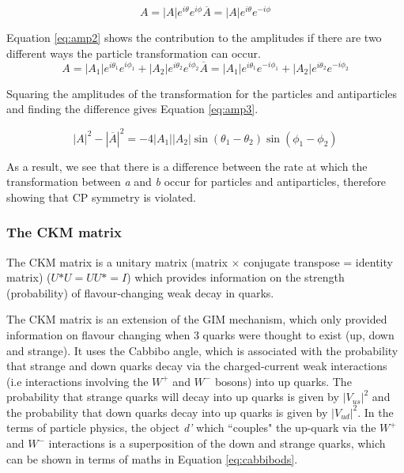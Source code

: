 \documentclass[11pt,oneside,a4paper]{article}
\begin{document}
	
\begin{equation}
\label{eq:amp}
A=|A|e^{i\theta }e^{i\phi }
{\overline{A}}=|A|e^{i\theta }e^{-i\phi }
\end{equation}

Equation \ref{eq:amp2} shows the contribution to the amplitudes if there are two different ways the particle transformation can occur.
\begin{equation}
\label{eq:amp2}
A=|A_{1}|e^{i\theta _{1}}e^{i\phi _{1}}+|A_{2}|e^{i\theta _{2}}e^{i\phi _{2}}
{\overline {A}}=|A_{1}|e^{i\theta _{1}}e^{-i\phi _{1}}+|A_{2}|e^{i\theta _{2}}e^{-i\phi _{2}}
\end{equation}

Squaring the amplitudes of the transformation for the particles and antiparticles and finding the difference gives Equation \ref{eq:amp3}.

\begin{equation}
\label{eq:amp3}
{\displaystyle |A|^{2}-|{\overline {A}}|^{2}=-4|A_{1}||A_{2}|\sin(\theta _{1}-\theta _{2})\sin(\phi _{1}-\phi _{2})}
\end{equation}

As a result, we see that there is a difference between the rate at which the transformation between \textit{a} and \textit{b} occur for particles and antiparticles, therefore showing that CP symmetry is violated.


\subsubsection{The CKM matrix}

The CKM matrix is a unitary matrix (matrix $\times$ conjugate transpose = identity matrix) ($U\mbox{*}U = UU\mbox{*}=I$) which provides information on the strength (probability) of flavour-changing weak decay in quarks.

The CKM matrix is an extension of the GIM mechanism, which only provided information on flavour changing when 3 quarks were thought to exist (up, down and strange). It uses the Cabbibo angle, which is associated with the probability that strange and down quarks decay via the charged-current weak interactions (i.e interactions involving the $W^+$ and $W^-$ bosons) into up quarks. The probability that strange quarks will decay into up quarks is given by $|V_{us}|^2$ and the probability that down quarks decay into up quarks is given by $|V_{ud}|^2$. In the terms of particle physics, the object \textit{d'} which ``couples" the up-quark via the $W^+$ and $W^-$ interactions is a superposition of the down and strange quarks, which can be shown in terms of maths in Equation \ref{eq:cabbibods}.
\end{document}
